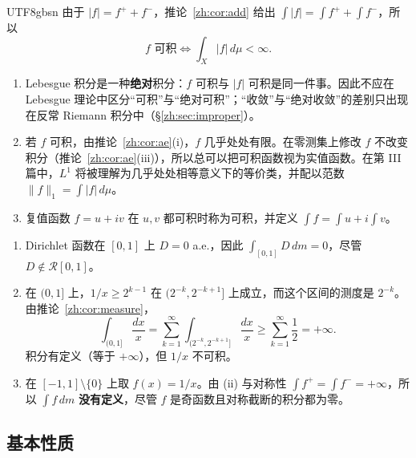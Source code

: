 \documentclass[11pt]{article}
\makeatletter
\newcommand{\envlabel}[1]{\protected@edef\@currentlabel{\themathenv}\label{#1}}
\makeatother
\begin{document}
\begin{CJK*}{UTF8}{gbsn}
由于 $|f|=f^{+}+f^{-}$，推论~\ref{zh:cor:add} 给出 $\int|f|=\int f^{+}+\int f^{-}$，所以
\[
f\text{ 可积}\iff\int_{X}|f|\,d\mu<\infty.
\]

\begin{remark}\envlabel{zh:rem:abs}
\leavevmode
\begin{enumerate}
  \item Lebesgue 积分是一种\textbf{绝对}积分：$f$ 可积与 $|f|$ 可积是同一件事。因此不应在 Lebesgue 理论中区分“可积”与“绝对可积”；“收敛”与“绝对收敛”的差别只出现在反常 Riemann 积分中（\S\ref{zh:sec:improper}）。
  \item 若 $f$ 可积，由推论~\ref{zh:cor:ae}(i)，$f$ 几乎处处有限。在零测集上修改 $f$ 不改变积分（推论~\ref{zh:cor:ae}(iii)），所以总可以把可积函数视为实值函数。在第 III 篇中，$L^{1}$ 将被理解为几乎处处相等意义下的等价类，并配以范数 $\|f\|_{1}=\int|f|\,d\mu$。
  \item 复值函数 $f=u+iv$ 在 $u,v$ 都可积时称为可积，并定义 $\int f=\int u+i\int v$。
\end{enumerate}
\end{remark}

\begin{example}\envlabel{zh:ex:int}
\leavevmode
\begin{enumerate}
  \item Dirichlet 函数在 $[0,1]$ 上 $D=0$ a.e.，因此 $\int_{[0,1]}D\,dm=0$，尽管 $D\notin\mathcal{R}[0,1]$。
  \item 在 $(0,1]$ 上，$1/x\geq2^{k-1}$ 在 $(2^{-k},2^{-k+1}]$ 上成立，而这个区间的测度是 $2^{-k}$。由推论~\ref{zh:cor:measure}，
  \[
  \int_{(0,1]}\frac{dx}{x}=\sum_{k=1}^{\infty}\int_{(2^{-k},2^{-k+1}]}\frac{dx}{x}\geq\sum_{k=1}^{\infty}\frac12=+\infty.
  \]
  积分有定义（等于 $+\infty$），但 $1/x$ 不可积。
  \item 在 $[-1,1]\setminus\{0\}$ 上取 $f(x)=1/x$。由 (ii) 与对称性 $\int f^{+}=\int f^{-}=+\infty$，所以 $\int f\,dm$ \textbf{没有定义}，尽管 $f$ 是奇函数且对称截断的积分都为零。
\end{enumerate}
\end{example}

\subsection{基本性质}


\end{CJK*}
\end{document}
